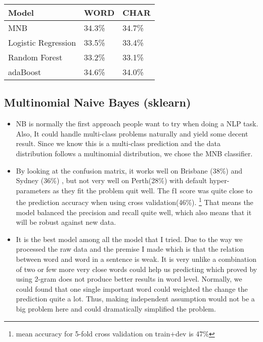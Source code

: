 \documentclass[11pt]{article}
\begin{document}
\begin{table}[h]
  \label{accuracy}
  \begin{center}
 \begin{tabular}{|l|l|l|}
       \hline
       Model & WORD & CHAR\\
       \hline\hline
       MNB & 34.3\% & 34.7\% \\
       Logistic Regression & 33.5\% & 33.4\% \\
       Random Forest & 33.2\% & 33.1\% \\
       adaBoost & 34.6\% & 34.0\% \\
       \hline
 \end{tabular}
  \end{center}
 \end{table}


\subsection{Multinomial Naive Bayes (sklearn)}
\begin{itemize}
      \item NB is normally the first approach people 
            want to try when doing a NLP task. Also, It could handle multi-class
            problems naturally and yield some decent result. Since we know this
            is a multi-class prediction and the data distribution follows a multinomial
            distribution, we chose the MNB classifier.
      \item By looking at the confusion matrix, it works well on Brisbane (38\%) and Sydney (36\%)
            , but not very well on Perth(28\%) with default hyper-parameters as they fit the problem quit well. The f1 score was quite
            close to the prediction accuracy when using cross validation(46\%).
            \footnote{mean accuracy for 5-fold cross validation on train+dev is 47\%}
             That means the model balanced the precision and recall quite
            well, which also means that it will be robust against new data.
      \item It is the best model among all the model that I tried. Due to the way we processed the raw data and the
            premise I made which is that the relation between word and word in a sentence is weak. It is very unlike a combination 
            of two or few more very close words could help us predicting which proved by using 2-gram does not produce better results
            in word level.
            Normally, we could found that one single important word could
            weighted the change the prediction quite a lot. Thus, making independent assumption would not be a big problem here and 
            could dramatically simplified the problem.
\end{itemize}
            
\end{document}
